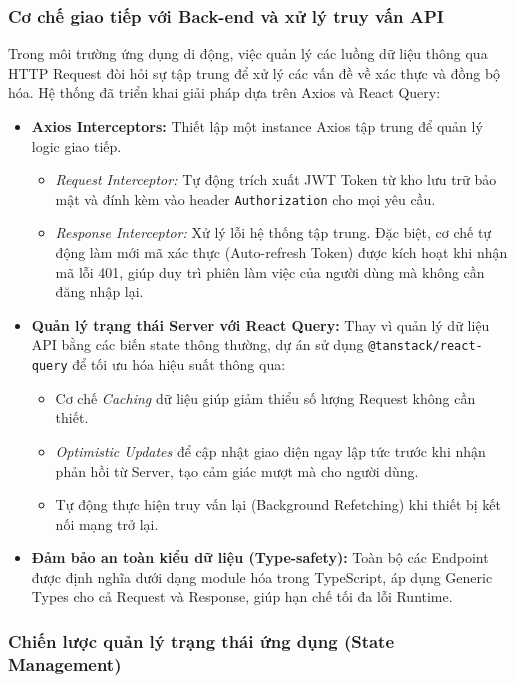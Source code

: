 \subsubsection{Cơ chế giao tiếp với Back-end và xử lý truy vấn API}

Trong môi trường ứng dụng di động, việc quản lý các luồng dữ liệu thông qua HTTP Request đòi hỏi sự tập trung để xử lý các vấn đề về xác thực và đồng bộ hóa. Hệ thống đã triển khai giải pháp dựa trên Axios và React Query:

\begin{itemize}
    \item \textbf{Axios Interceptors:} Thiết lập một instance Axios tập trung để quản lý logic giao tiếp. 
    \begin{itemize}
        \item \textit{Request Interceptor:} Tự động trích xuất JWT Token từ kho lưu trữ bảo mật và đính kèm vào header \texttt{Authorization} cho mọi yêu cầu.
        \item \textit{Response Interceptor:} Xử lý lỗi hệ thống tập trung. Đặc biệt, cơ chế tự động làm mới mã xác thực (Auto-refresh Token) được kích hoạt khi nhận mã lỗi 401, giúp duy trì phiên làm việc của người dùng mà không cần đăng nhập lại.
    \end{itemize}
    \item \textbf{Quản lý trạng thái Server với React Query:} Thay vì quản lý dữ liệu API bằng các biến state thông thường, dự án sử dụng \texttt{@tanstack/react-query} để tối ưu hóa hiệu suất thông qua:
    \begin{itemize}
        \item Cơ chế \textit{Caching} dữ liệu giúp giảm thiểu số lượng Request không cần thiết.
        \item \textit{Optimistic Updates} để cập nhật giao diện ngay lập tức trước khi nhận phản hồi từ Server, tạo cảm giác mượt mà cho người dùng.
        \item Tự động thực hiện truy vấn lại (Background Refetching) khi thiết bị kết nối mạng trở lại.
    \end{itemize}
    \item \textbf{Đảm bảo an toàn kiểu dữ liệu (Type-safety):} Toàn bộ các Endpoint được định nghĩa dưới dạng module hóa trong TypeScript, áp dụng Generic Types cho cả Request và Response, giúp hạn chế tối đa lỗi Runtime.
\end{itemize}

\subsubsection{Chiến lược quản lý trạng thái ứng dụng (State Management)}

